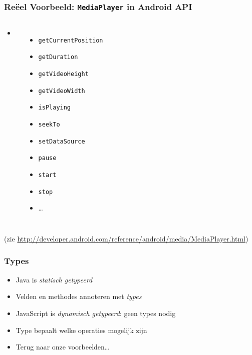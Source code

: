\begin{frame}
  \frametitle{Re\"eel Voorbeeld: {\tt MediaPlayer} in Android API}
  \begin{columns}[t]
    \begin{itemize}
      \item {}
    \end{itemize}

    \begin{itemize}
      \item {\tt getCurrentPosition}
      \item {\tt getDuration}
      \item {\tt getVideoHeight}
      \item {\tt getVideoWidth}
      \item {\tt isPlaying}
      \item {\tt seekTo}
      \item {\tt setDataSource}
      \item {\tt pause}
      \item {\tt start}
      \item {\tt stop}
      \item \dots
    \end{itemize}
  \end{columns}
  \vskip4mm
  {\tiny (zie \url{http://developer.android.com/reference/android/media/MediaPlayer.html})}
\end{frame}

\begin{frame}
  \frametitle{Types}
  \begin{itemize}
    \item Java is \emph{statisch getypeerd}
    \item Velden en methodes annoteren met \emph{types}
    \item JavaScript is \emph{dynamisch getypeerd}: geen types nodig
    \item Type bepaalt welke operaties mogelijk zijn
    \item Terug naar onze voorbeelden\dots
  \end{itemize}
\end{frame}

